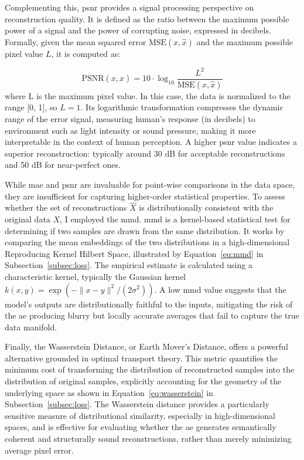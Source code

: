 Complementing this, \gls{psnr} provides a signal processing perspective on reconstruction quality. 
It is defined as the ratio between the maximum possible power of a signal and the power of corrupting noise, expressed in decibels. 
Formally, given the mean squared error $\text{MSE}(x, \hat{x})$ and the maximum possible pixel value $L$, it is computed as:

\begin{equation}
    \text{PSNR}(x, \hat{x}) = 10 \cdot \log_{10}\frac{L^2}{\text{MSE}(x, \hat{x})}
\end{equation}
where L is the maximum pixel value. 
In this case, the data is normalized to the range [0, 1], so $L = 1$.
Its logarithmic transformation compresses the dynamic range of the error signal, measuring human's response (in decibels) to environment such as light intensity or sound pressure, making it more interpretable in the context of human perception.
A higher \gls{psnr} value indicates a superior reconstruction: typically around 30 dB for acceptable reconstructions and 50 dB for near-perfect ones.

While \gls{mae} and \gls{psnr} are invaluable for point-wise comparisons in the data space, they are insufficient for capturing higher-order statistical properties. 
To assess whether the set of reconstructions $\hat{X}$ is distributionally consistent with the original data $X$, I employed the \gls{mmd}.
\gls{mmd} is a kernel-based statistical test for determining if two samples are drawn from the same distribution. 
It works by comparing the mean embeddings of the two distributions in a high-dimensional Reproducing Kernel Hilbert Space, illustrated by Equation~\ref{eq:mmd} in Subsection~\ref{subsec:loss}.
The empirical estimate is calculated using a characteristic kernel, typically the Gaussian kernel $k(x, y) = \exp\left(-\|x - y\|^2 / (2\sigma^2)\right)$. 
A low \gls{mmd} value suggests that the model's outputs are distributionally faithful to the inputs, mitigating the risk of the \gls{ae} producing blurry but locally accurate averages that fail to capture the true data manifold.

Finally, the Wasserstein Distance, or Earth Mover's Distance, offers a powerful alternative grounded in optimal transport theory.
This metric quantifies the minimum cost of transforming the distribution of reconstructed samples into the distribution of original samples, explicitly accounting for the geometry of the underlying space as shown in Equation~\ref{eq:wasserstein} in Subsection~\ref{subsec:loss}.
The Wasserstein distance provides a particularly sensitive measure of distributional similarity, especially in high-dimensional spaces, and is effective for evaluating whether the \gls{ae} generates semantically coherent and structurally sound reconstructions, rather than merely minimizing average pixel error.


